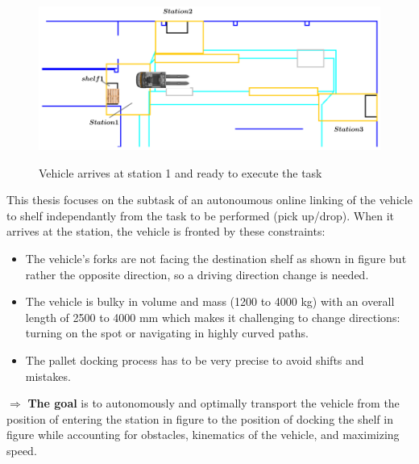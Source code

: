 \begin{figure}[H]
    \begin{center}
       \includegraphics[width=5in]{images/Chap0/arrive.png}\\
       \caption{Vehicle arrives at station 1 and ready to execute the task}
       \label{dock}
       \end{center}
\end{figure}

This thesis focuses on the subtask of an autonoumous online linking of the vehicle to shelf
independantly from the task to be performed (pick up/drop). 
When it arrives at the station, the vehicle is fronted by these constraints:

\begin{itemize}
    \item The vehicle’s forks are not facing the destination shelf as shown in figure  
    but rather the opposite direction, 
    so a driving direction change is needed. 

    \item The vehicle is bulky in volume and mass (1200 to 4000 kg) with an overall 
    length of 2500 to 4000 mm  \cite{R5}
    which makes it challenging  to change directions: turning on the spot or 
    navigating in highly curved paths. 
    
    \item The pallet docking process has to be very precise to avoid shifts and mistakes. 
\end{itemize}

$\Rightarrow$ \textbf{The goal} is to autonomously and optimally transport the vehicle from the position of entering the station in
figure  to the position of docking the shelf in figure  while accounting for obstacles,
kinematics of the vehicle, and maximizing speed. 

